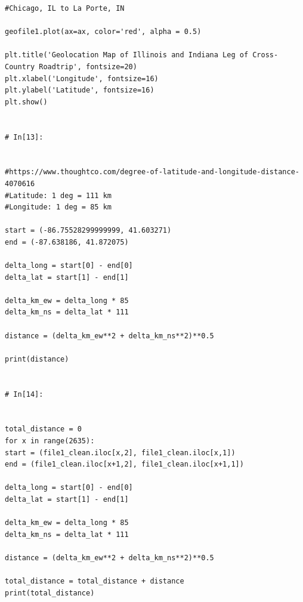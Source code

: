 \documentclass[12pt]{article}
\begin{document}
\begin{lstlisting}
#Chicago, IL to La Porte, IN

geofile1.plot(ax=ax, color='red', alpha = 0.5)

plt.title('Geolocation Map of Illinois and Indiana Leg of Cross-Country Roadtrip', fontsize=20)
plt.xlabel('Longitude', fontsize=16)
plt.ylabel('Latitude', fontsize=16)
plt.show()


# In[13]:


#https://www.thoughtco.com/degree-of-latitude-and-longitude-distance-4070616
#Latitude: 1 deg = 111 km
#Longitude: 1 deg = 85 km

start = (-86.75528299999999, 41.603271)
end = (-87.638186, 41.872075)

delta_long = start[0] - end[0]
delta_lat = start[1] - end[1]

delta_km_ew = delta_long * 85
delta_km_ns = delta_lat * 111

distance = (delta_km_ew**2 + delta_km_ns**2)**0.5

print(distance)


# In[14]:


total_distance = 0
for x in range(2635):
start = (file1_clean.iloc[x,2], file1_clean.iloc[x,1])
end = (file1_clean.iloc[x+1,2], file1_clean.iloc[x+1,1])

delta_long = start[0] - end[0]
delta_lat = start[1] - end[1]

delta_km_ew = delta_long * 85
delta_km_ns = delta_lat * 111

distance = (delta_km_ew**2 + delta_km_ns**2)**0.5

total_distance = total_distance + distance
print(total_distance)



		
		
	\end{lstlisting}
\end{document}
